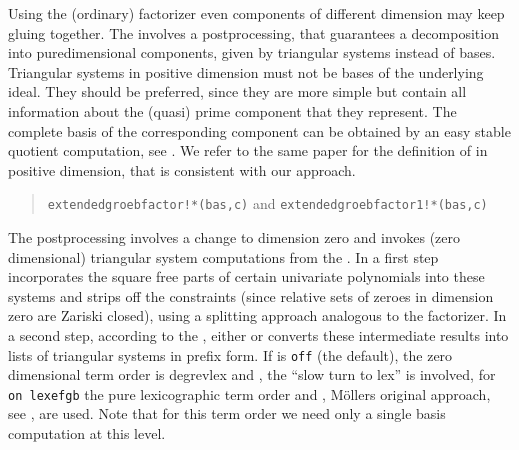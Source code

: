 Using the (ordinary) \gr factorizer even components of different
dimension may keep gluing together. The 
involves a postprocessing, that guarantees a decomposition into
puredimensional components, given by triangular systems instead of \gr 
bases. Triangular systems in positive dimension must not be \gr bases
of the underlying ideal. They should be preferred, since they are more
simple but contain all information about the (quasi) prime component
that they represent. The complete \gr basis of the corresponding
component can be obtained by an easy stable quotient computation, see
\cite{efgb}. We refer to the same paper for the definition of
 in positive dimension, that is consistent
with our approach. 
\begin{quote}
\verb|extendedgroebfactor!*(bas,c)| and
\verb|extendedgroebfactor1!*(bas,c)| 
  

\end{quote}
The postprocessing involves a change to dimension zero and invokes
(zero dimensional) triangular system computations from the
. In a first step 
incorporates the square free parts of certain univariate polynomials
into these systems and strips off the constraints (since relative sets
of zeroes in dimension zero are Zariski closed), using a splitting
approach analogous to the \gr factorizer. In a second step, according
to the , either  or
 converts these intermediate results into lists of
triangular systems in prefix form. If  is {\tt off} (the 
default), the zero dimensional term order is degrevlex and
, the ``slow turn to lex'' is involved, for {\tt on
lexefgb} the pure lexicographic term order and ,
M\"ollers original approach, see \cite{Moeller}, are used. Note that
for this term order we need only a single \gr basis computation at
this level.

